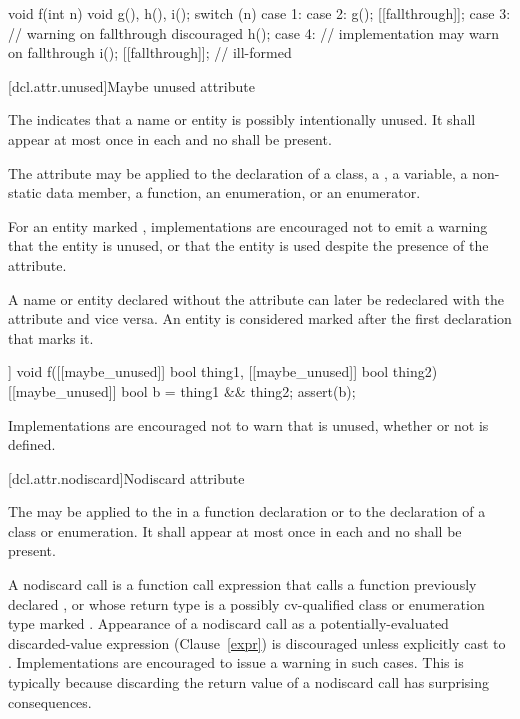 \pnum
\enterexample
\begin{codeblock}
void f(int n) {
  void g(), h(), i();
  switch (n) {
  case 1:
  case 2:
    g();
    [[fallthrough]];
  case 3: // warning on fallthrough discouraged
    h();
  case 4: // implementation may warn on fallthrough
    i();
    [[fallthrough]]; // ill-formed
  }
}
\end{codeblock}
\exitexample

[dcl.attr.unused]{Maybe unused attribute}%

\pnum
The  
indicates that a name or entity is possibly intentionally unused.
It shall appear at most once in each  and
no  shall be present.

\pnum
The attribute may be applied to the declaration of a class,
a , a variable, a non-static data member,
a function, an enumeration, or an enumerator.

\pnum
\enternote
For an entity marked , implementations
are encouraged not to emit a warning that the entity is unused, or
that the entity is used despite the presence of the attribute.
\exitnote

\pnum
A name or entity declared without the  attribute
can later be redeclared with the attribute
and vice versa.
An entity is considered marked
after the first declaration that marks it.

\pnum
\enterexample
\begin{codeblock}
[[maybe_unused]] void f([[maybe_unused]] bool thing1,
                        [[maybe_unused]] bool thing2) {
  [[maybe_unused]] bool b = thing1 && thing2;
  assert(b);
}
\end{codeblock}
Implementations are encouraged not to warn that  is unused,
whether or not  is defined.
\exitexample

[dcl.attr.nodiscard]{Nodiscard attribute}%

\pnum
The  
may be applied to the 
in a function declaration or to the declaration of a class or enumeration.
It shall appear at most once in each  and
no  shall be present.

\pnum
\enternote
A nodiscard call is a function call expression that
calls a function previously declared , or
whose return type is a possibly cv-qualified class or enumeration type
marked . Appearance of a nodiscard call as
a potentially-evaluated discarded-value expression (Clause~\ref{expr})
is discouraged unless explicitly cast to .
Implementations are encouraged to issue a warning in such cases.
This is typically because discarding the return value
of a nodiscard call has surprising consequences.
\exitnote

